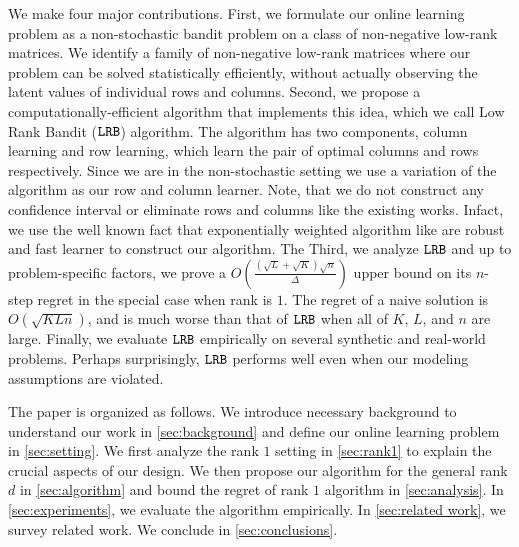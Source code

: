 
We make four major contributions. First, we formulate our online learning problem as a non-stochastic bandit problem on a class of non-negative low-rank matrices. We identify a family of non-negative low-rank matrices where our problem can be solved statistically efficiently, without actually observing the latent values of individual rows and columns. Second, we propose a computationally-efficient algorithm that implements this idea, which we call Low Rank Bandit (${\tt LRB}$) algorithm. The algorithm has two components, column learning and row learning, which learn the pair  of optimal columns and rows respectively. Since we are in the non-stochastic setting we use a variation of the \expthree \citep{auer2002nonstochastic} algorithm as our row and column learner. Note, that we do not construct any confidence interval or eliminate rows and columns like the existing works. Infact, we use the well known fact that exponentially weighted algorithm like \expthree are robust and fast learner to construct our algorithm. The Third, we analyze ${\tt LRB}$ and up to problem-specific factors, we prove a $O\left(\frac{\left(\sqrt{L } + \sqrt{K }\right)\sqrt{n}}{\Delta}\right)$ upper bound on its $n$-step regret in the special case when rank is $1$. The regret of a naive solution is $O(\sqrt{K L n})$, and is much worse than that of ${\tt LRB}$ when all of $K$, $L$, and $n$ are large. Finally, we evaluate ${\tt LRB}$ empirically on several synthetic and real-world problems. Perhaps surprisingly, ${\tt LRB}$ performs well even when our modeling assumptions are violated.

The paper is organized as follows. We introduce necessary background to understand our work in \cref{sec:background} and define our online learning problem in \cref{sec:setting}. We first analyze the rank $1$ setting in \cref{sec:rank1} to explain the crucial aspects of our design. We then propose our algorithm for the general rank $d$ in \cref{sec:algorithm} and bound the regret of rank $1$ algorithm in \cref{sec:analysis}. In \cref{sec:experiments}, we evaluate the algorithm empirically. In \cref{sec:related work}, we survey related work. We conclude in \cref{sec:conclusions}. 

